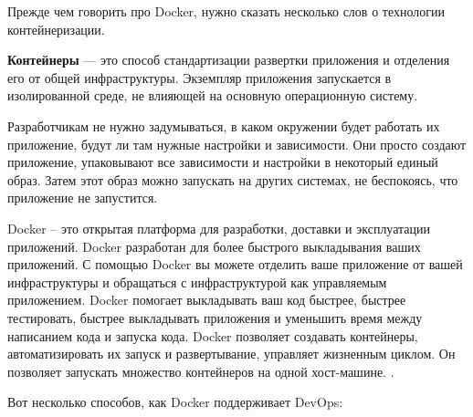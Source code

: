 \documentclass[referat]{SCWorks}
\begin{document}
Прежде чем говорить про Docker, нужно сказать несколько слов о технологии контейнеризации.

\textbf{Контейнеры} — это способ стандартизации развертки приложения и отделения его от общей инфраструктуры. Экземпляр приложения запускается в изолированной среде, не влияющей на основную операционную систему. 

Разработчикам не нужно задумываться, в каком окружении будет работать их приложение, будут ли там нужные настройки и зависимости. Они просто создают приложение, упаковывают все зависимости и настройки в некоторый единый образ. Затем этот образ можно запускать на других системах, не беспокоясь, что приложение не запустится.

Docker -- это открытая платформа для разработки, доставки и эксплуатации приложений. Docker разработан для более быстрого выкладывания ваших приложений. С помощью Docker вы можете отделить ваше приложение от вашей инфраструктуры и обращаться с инфраструктурой как управляемым приложением. Docker помогает выкладывать ваш код быстрее, быстрее тестировать, быстрее выкладывать приложения и уменьшить время между написанием кода и запуска кода. Docker позволяет создавать контейнеры, автоматизировать их запуск и развертывание, управляет жизненным циклом. Он позволяет запускать множество контейнеров на одной хост-машине. \cite{SelectelDocker} \cite{HabrDocker}.

Вот несколько способов, как Docker поддерживает DevOps:
\end{document}

